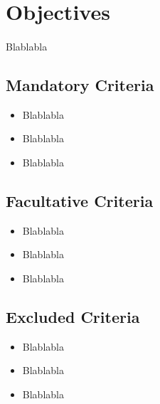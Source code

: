 \newpage
\section{Objectives}

\paragraph{}Blablabla

\subsection{Mandatory Criteria}

\begin{itemize}
\item Blablabla
\item Blablabla
\item Blablabla
\end{itemize}

\subsection{Facultative Criteria}

\begin{itemize}
\item Blablabla
\item Blablabla
\item Blablabla
\end{itemize}

\subsection{Excluded Criteria}

\begin{itemize}
\item Blablabla
\item Blablabla
\item Blablabla
\end{itemize}
